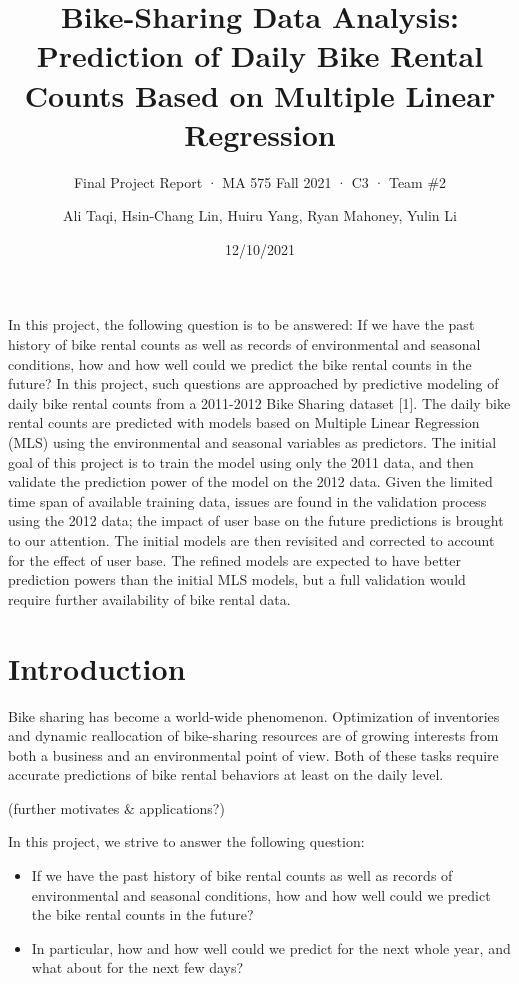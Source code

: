 \documentclass[
  twocolumn]{article}
\title{Bike-Sharing Data Analysis: Prediction of Daily Bike Rental Counts Based
on Multiple Linear Regression}
\subtitle{Final Project Report · MA 575 Fall 2021 · C3 · Team \#2}
\author{Ali Taqi, Hsin-Chang Lin, Huiru Yang, Ryan Mahoney, Yulin Li}
\date{12/10/2021}
\begin{document}
\maketitle

In this project, the following question is to be answered: If we have
the past history of bike rental counts as well as records of
environmental and seasonal conditions, how and how well could we predict
the bike rental counts in the future? In this project, such questions
are approached by predictive modeling of daily bike rental counts from a
2011-2012 Bike Sharing dataset {[}1{]}. The daily bike rental counts are
predicted with models based on Multiple Linear Regression (MLS) using
the environmental and seasonal variables as predictors. The initial goal
of this project is to train the model using only the 2011 data, and then
validate the prediction power of the model on the 2012 data. Given the
limited time span of available training data, issues are found in the
validation process using the 2012 data; the impact of user base on the
future predictions is brought to our attention. The initial models are
then revisited and corrected to account for the effect of user base. The
refined models are expected to have better prediction powers than the
initial MLS models, but a full validation would require further
availability of bike rental data.

\hypertarget{introduction}{%
\section{Introduction}\label{introduction}}

Bike sharing has become a world-wide phenomenon. Optimization of
inventories and dynamic reallocation of bike-sharing resources are of
growing interests from both a business and an environmental point of
view. Both of these tasks require accurate predictions of bike rental
behaviors at least on the daily level.

(further motivates \& applications?)

In this project, we strive to answer the following question:

\begin{itemize}
\item
  If we have the past history of bike rental counts as well as records
  of environmental and seasonal conditions, how and how well could we
  predict the bike rental counts in the future?
\item
  In particular, how and how well could we predict for the next whole
  year, and what about for the next few days?
\end{itemize}
\end{document}
